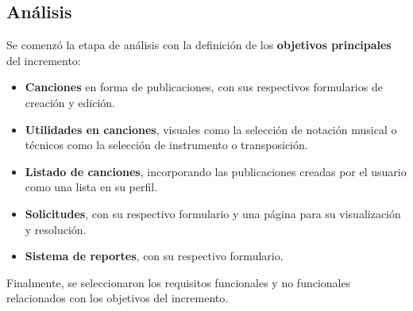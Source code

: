 \subsection{Análisis}
Se comenzó la etapa de análisis con la definición de los \textbf{objetivos principales} del incremento:

\begin{itemize}
    \item \textbf{Canciones} en forma de publicaciones, con sus respectivos formularios de creación y edición.
    \item \textbf{Utilidades en canciones}, visuales como la selección de \gls{notación musical} o técnicos como la selección de instrumento o \gls{transposición}.
    \item \textbf{Listado de canciones}, incorporando las publicaciones creadas por el usuario como una lista en su perfil.
    \item \textbf{Solicitudes}, con su respectivo formulario y una página para su visualización y resolución.
    \item \textbf{Sistema de reportes}, con su respectivo formulario.
\end{itemize}

Finalmente, se seleccionaron los requisitos funcionales  y no funcionales  relacionados con los objetivos del incremento.

